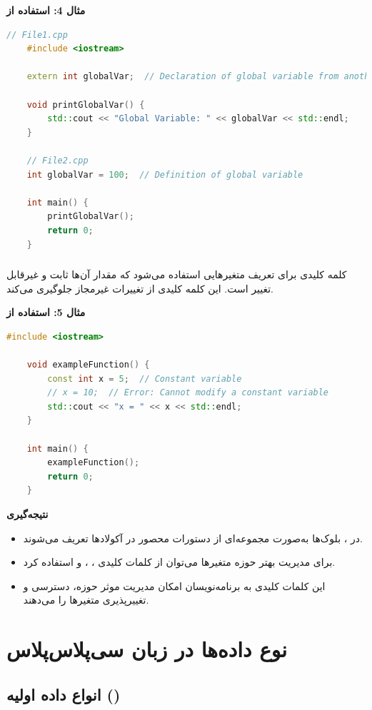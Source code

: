 \documentclass[12pt, a4paper]{report}
\begin{document}
\textbf{مثال 4: استفاده از }
\LTR
\begin{lstlisting}[language=C++, breaklines=true]
	// File1.cpp
	#include <iostream>
	
	extern int globalVar;  // Declaration of global variable from another file
	
	void printGlobalVar() {
		std::cout << "Global Variable: " << globalVar << std::endl;
	}
	
	// File2.cpp
	int globalVar = 100;  // Definition of global variable
	
	int main() {
		printGlobalVar();
		return 0;
	}
\end{lstlisting}
\RTL
\subsubsection{}
کلمه کلیدی  برای تعریف متغیرهایی استفاده می‌شود که مقدار آن‌ها ثابت و غیرقابل تغییر است. این کلمه کلیدی از تغییرات غیرمجاز جلوگیری می‌کند.

\textbf{مثال 5: استفاده از }
\LTR
\begin{lstlisting}[language=C++, breaklines=true]
	#include <iostream>
	
	void exampleFunction() {
		const int x = 5;  // Constant variable
		// x = 10;  // Error: Cannot modify a constant variable
		std::cout << "x = " << x << std::endl;
	}
	
	int main() {
		exampleFunction();
		return 0;
	}
\end{lstlisting}
\RTL

\textbf{نتیجه‌گیری} \\
\begin{itemize}
	\item در ، بلوک‌ها به‌صورت مجموعه‌ای از دستورات محصور در آکولادها \lr{\{\}} تعریف می‌شوند.
	\item برای مدیریت بهتر حوزه متغیرها می‌توان از کلمات کلیدی ، ،  و  استفاده کرد.
	\item این کلمات کلیدی به برنامه‌نویسان امکان مدیریت موثر حوزه، دسترسی و تغییرپذیری متغیرها را می‌دهند.
\end{itemize}
\section{نوع داده‌ها در زبان سی‌پلاس‌پلاس}

\subsection{انواع داده اولیه ()}
\end{document}

